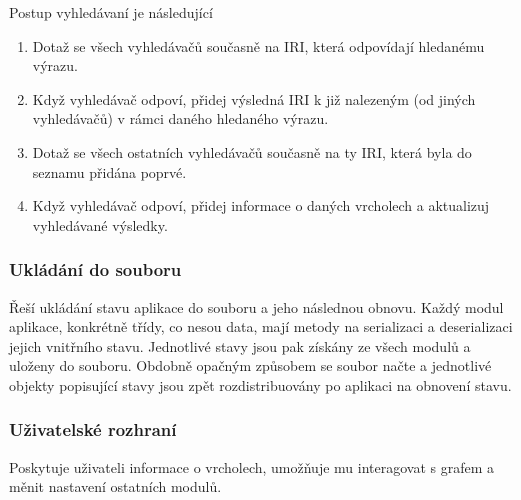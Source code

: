 Postup vyhledávaní je následující
\begin{enumerate}
    \item Dotaž se všech vyhledávačů současně na IRI, která odpovídají hledanému výrazu.
    \item Když vyhledávač odpoví, přidej výsledná IRI k již nalezeným (od jiných vyhledávačů) v rámci daného hledaného výrazu.
    \item Dotaž se všech ostatních vyhledávačů současně na ty IRI, která byla do seznamu přidána poprvé.
    \item Když vyhledávač odpoví, přidej informace o daných vrcholech a aktualizuj vyhledávané výsledky.
\end{enumerate}

\subsubsection{Ukládání do souboru}
Řeší ukládání stavu aplikace do souboru a jeho následnou obnovu. Každý modul aplikace, konkrétně třídy, co nesou data, mají metody na serializaci a deserializaci jejich vnitřního stavu. Jednotlivé stavy jsou pak získány ze všech modulů a uloženy do souboru. Obdobně opačným způsobem se soubor načte a jednotlivé objekty popisující stavy jsou zpět rozdistribuovány po aplikaci na obnovení stavu.

\subsubsection{Uživatelské rozhraní}
Poskytuje uživateli informace o vrcholech, umožňuje mu interagovat s grafem a měnit nastavení ostatních modulů.